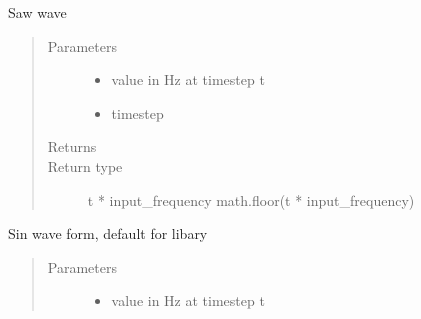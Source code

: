\documentclass[letterpaper,10pt,english,openany,oneside]{sphinxmanual}
\begin{document}
\begin{fulllineitems}
\begin{fulllineitems}
\begin{quote}
\begin{description}
\end{description}\end{quote}

\end{fulllineitems}


\begin{fulllineitems}
\label{\detokenize{dpav:dpav.audio.wave_table.saw}}
\sphinxAtStartPar
Saw wave
\begin{quote}\begin{description}
\item[{Parameters}] \leavevmode\begin{itemize}
\item {} 
\sphinxAtStartPar
{} \textendash{} value in Hz at timestep t

\item {} 
\sphinxAtStartPar
{} \textendash{} timestep

\end{itemize}

\item[{Returns}] \leavevmode
\sphinxAtStartPar


\item[{Return type}] \leavevmode
\sphinxAtStartPar
t * input\_frequency \sphinxhyphen{} math.floor(t * input\_frequency)

\end{description}\end{quote}

\end{fulllineitems}


\begin{fulllineitems}
\label{\detokenize{dpav:dpav.audio.wave_table.sin}}
\sphinxAtStartPar
Sin wave form, default for libary
\begin{quote}\begin{description}
\item[{Parameters}] \leavevmode\begin{itemize}
\item {} 
\sphinxAtStartPar
{} \textendash{} value in Hz at timestep t


\end{itemize}
\end{description}
\end{quote}
\end{fulllineitems}
\end{fulllineitems}
\end{document}
